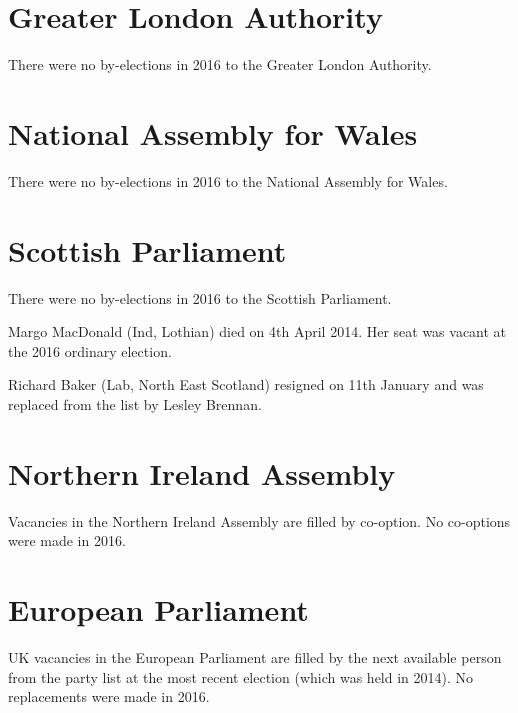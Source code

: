 \documentclass[a4paper,openany]{book}
\begin{document}
\section{Greater London Authority}

There were no by-elections in 2016 to the Greater London Authority.

\section{National Assembly for Wales}

There were no by-elections in 2016 to the National Assembly for Wales.

\section{Scottish Parliament}

There were no by-elections in 2016 to the Scottish Parliament.

Margo MacDonald (Ind, Lothian) died on 4th April 2014.  Her seat was vacant at the 2016 ordinary election.

Richard Baker (Lab, North East Scotland) resigned on 11th January and was replaced from the list by Lesley Brennan.

\section{Northern Ireland Assembly}

Vacancies in the Northern Ireland Assembly are filled by co-option.  No co-options were made in 2016.


\section{European Parliament}

UK vacancies in the European Parliament are filled by the next available person from the party list at the most recent election (which was held in 2014). 
No replacements were made in 2016.
\end{document}
